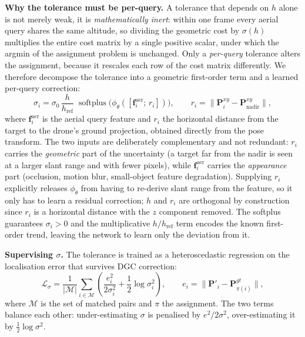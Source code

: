 \documentclass[9.5pt,twocolumn,a4paper]{IEEEtran}
\def\mb#1{\mathbf{#1}}
\begin{document}
\noindent\textbf{Why the tolerance must be per-query.} A tolerance that depends on $h$ alone is not merely weak, it is \emph{mathematically inert}: within one frame every aerial query shares the same altitude, so dividing the geometric cost by $\sigma(h)$ multiplies the entire cost matrix by a single positive scalar, under which the argmin of the assignment problem is unchanged. Only a \emph{per-query} tolerance alters the assignment, because it rescales each row of the cost matrix differently. We therefore decompose the tolerance into a geometric first-order term and a learned per-query correction:
\begin{equation}
    \sigma_i = \sigma_0\,\frac{h}{h_{\text{ref}}}\;\operatorname{softplus}\!\big(\phi_\theta([\mb{f}_i^{\text{aer}};\, r_i])\big), \qquad
    r_i = \big\|\mb{P}_i^{xy} - \mb{P}_{\text{nadir}}^{xy}\big\|,
    \label{eq:sigma_per_query}
\end{equation}
where $\mb{f}_i^{\text{aer}}$ is the aerial query feature and $r_i$ the horizontal distance from the target to the drone's ground projection, obtained directly from the pose transform. The two inputs are deliberately complementary and not redundant: $r_i$ carries the \emph{geometric} part of the uncertainty (a target far from the nadir is seen at a larger slant range and with fewer pixels), while $\mb{f}_i^{\text{aer}}$ carries the \emph{appearance} part (occlusion, motion blur, small-object feature degradation). Supplying $r_i$ explicitly releases $\phi_\theta$ from having to re-derive slant range from the feature, so it only has to learn a residual correction; $h$ and $r_i$ are orthogonal by construction since $r_i$ is a horizontal distance with the $z$ component removed. The softplus guarantees $\sigma_i > 0$ and the multiplicative $h/h_{\text{ref}}$ term encodes the known first-order trend, leaving the network to learn only the deviation from it.

\noindent\textbf{Supervising $\sigma$.} The tolerance is trained as a heteroscedastic regression on the localisation error that survives DGC correction:
\begin{equation}
    \mathcal{L}_{\sigma} = \frac{1}{|\mathcal{M}|}\sum_{i \in \mathcal{M}}
    \left(\frac{e_i^{2}}{2\sigma_i^{2}} + \frac{1}{2}\log \sigma_i^{2}\right), \qquad
    e_i = \big\|\mb{P}'_{i} - \mb{P}^{gt}_{\pi(i)}\big\|,
    \label{eq:nll_sigma}
\end{equation}
where $\mathcal{M}$ is the set of matched pairs and $\pi$ the assignment. The two terms balance each other: under-estimating $\sigma$ is penalised by $e^2/2\sigma^2$, over-estimating it by $\tfrac{1}{2}\log\sigma^2$.
\end{document}
